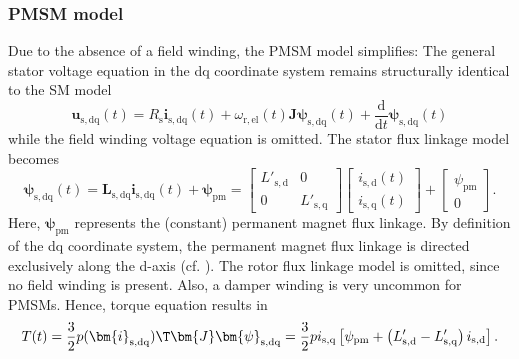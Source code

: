 \begin{frame}
	\frametitle{PMSM model}
	Due to the absence of a field winding, the PMSM model simplifies: The general stator voltage equation in the dq coordinate system remains structurally identical to the SM model
	$$\bm{u}_\mathrm{s,dq}(t) = R_\mathrm{s} \bm{i}_\mathrm{s,dq}(t)+ \omega_\mathrm{r,el}(t)\bm{J}\bm{\psi}_\mathrm{s,dq}(t) + \frac{\mathrm{d}}{\mathrm{d}t}\bm{\psi}_\mathrm{s,dq}(t)$$
	while the field winding voltage equation is omitted. \pause The stator flux linkage model becomes
	\begin{equation}
		\bm{\psi}_\mathrm{s,dq}(t) = \bm{L}_\mathrm{s,dq}\bm{i}_{\mathrm{s,dq}}(t) + \bm{\psi}_\mathrm{pm} = \begin{bmatrix}
			L'_\mathrm{s,d} & 0               \\
			0               & L'_\mathrm{s,q}
		\end{bmatrix} \begin{bmatrix}
			i_{\mathrm{s,d}}(t) \\ i_{\mathrm{s,q}}(t)
		\end{bmatrix} + \begin{bmatrix}
			\psi_\mathrm{pm} \\ 0
		\end{bmatrix}.
	\end{equation}
	Here, $\bm{\psi}_\mathrm{pm}$ represents the (constant) permanent magnet flux linkage. \pause By definition of the dq coordinate system, the permanent magnet flux linkage is directed exclusively along the d-axis (cf. ). The rotor flux linkage model is omitted, since no field winding is present. Also, a damper winding is very uncommon for PMSMs. \pause Hence, torque equation results in
	\begin{equation}
		T(t) = \frac{3}{2} p (\bm{i}_\mathrm{s,dq})\T\bm{J}\bm{\psi}_\mathrm{s,dq} = \frac{3}{2} p i_\mathrm{s,q}\left[ \psi_\mathrm{pm} + \left(L'_\mathrm{s,d}-L'_\mathrm{s,q}\right)i_\mathrm{s,d}\right].
	\end{equation}
\end{frame}

